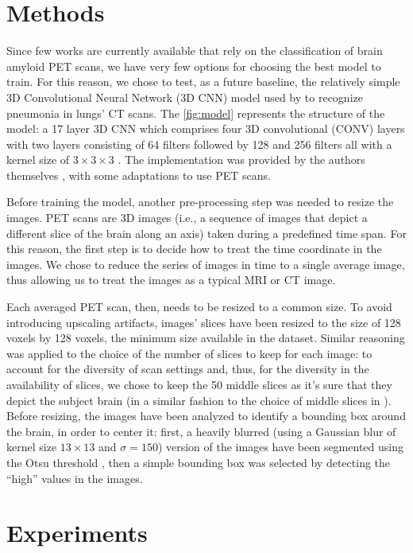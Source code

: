 \documentclass[10pt,twocolumn,letterpaper]{article}
\begin{document}
\section{Methods}
\label{sec:methods}

Since few works are currently available that rely on the classification of brain
amyloid PET scans, we have very few options for choosing the best model to
train. For this reason, we chose to test, as a future baseline, the relatively
simple 3D Convolutional Neural Network (3D CNN) model used by \cite{Zunair2020}
to recognize pneumonia in lungs' CT scans. The \cref{fig:model} represents the
structure of the model: a 17 layer 3D CNN which comprises four 3D convolutional
(CONV) layers with two layers consisting of 64 filters followed by 128 and 256
filters all with a kernel size of $3 \times 3 \times 3$ \cite{Zunair2020}. The
implementation was provided by the authors themselves
\cite{Zunair2020Implementation}, with some adaptations to use PET scans.

Before training the model, another pre-processing step was needed to resize the
images. PET scans are 3D images (i.e., a sequence of images that depict a
different slice of the brain along an axis) taken during a predefined time span.
For this reason, the first step is to decide how to treat the time coordinate in
the images. We chose to reduce the series of images in time to a single average
image, thus allowing us to treat the images as a typical MRI or CT image.

Each averaged PET scan, then, needs to be resized to a common size. To avoid
introducing upscaling artifacts, images' slices have been resized to the size of
128 voxels by 128 voxels, the minimum size available in the dataset. Similar
reasoning was applied to the choice of the number of slices to keep for each
image: to account for the diversity of scan settings and, thus, for the
diversity in the availability of slices, we chose to keep the 50 middle slices
as it's sure that they depict the subject brain (in a similar fashion to the
choice of middle slices in \cite{Altay2020}). Before resizing, the images have
been analyzed to identify a bounding box around the brain, in order to center
it: first, a heavily blurred (using a Gaussian blur of kernel size
$13 \times 13$ and $\sigma = 150$) version of the images have been segmented
using the Otsu threshold \cite{Otsu1979}, then a simple bounding box was
selected by detecting the ``high'' values in the images.

\section{Experiments}
\label{sec:experiments}
\end{document}
